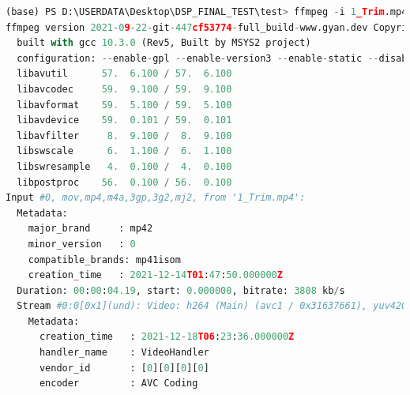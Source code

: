 \documentclass[10pt,UTF8]{ctexart}
\begin{document}
\begin{lstlisting}[language={python}]
(base) PS D:\USERDATA\Desktop\DSP_FINAL_TEST\test> ffmpeg -i 1_Trim.mp4 -s 320x240 -pix_fmt yuv420p -r 15 1_Trim.yuv
ffmpeg version 2021-09-22-git-447cf53774-full_build-www.gyan.dev Copyright (c) 2000-2021 the FFmpeg developers
  built with gcc 10.3.0 (Rev5, Built by MSYS2 project)
  configuration: --enable-gpl --enable-version3 --enable-static --disable-w32threads --disable-autodetect --enable-fontconfig --enable-iconv --enable-gnutls --enable-libxml2 --enable-gmp --enable-lzma --enable-libsnappy --enable-zlib --enable-librist --enable-libsrt --enable-libssh --enable-libzmq --enable-avisynth --enable-libbluray --enable-libcaca --enable-sdl2 --enable-libdav1d --enable-libzvbi --enable-librav1e --enable-libsvtav1 --enable-libwebp --enable-libx264 --enable-libx265 --enable-libxvid --enable-libaom --enable-libopenjpeg --enable-libvpx --enable-libass --enable-frei0r --enable-libfreetype --enable-libfribidi --enable-libvidstab --enable-libvmaf --enable-libzimg --enable-amf --enable-cuda-llvm --enable-cuvid --enable-ffnvcodec --enable-nvdec --enable-nvenc --enable-d3d11va --enable-dxva2 --enable-libmfx --enable-libglslang --enable-vulkan --enable-opencl --enable-libcdio --enable-libgme --enable-libmodplug --enable-libopenmpt --enable-libopencore-amrwb --enable-libmp3lame --enable-libshine --enable-libtheora --enable-libtwolame --enable-libvo-amrwbenc --enable-libilbc --enable-libgsm --enable-libopencore-amrnb --enable-libopus --enable-libspeex --enable-libvorbis --enable-ladspa --enable-libbs2b --enable-libflite --enable-libmysofa --enable-librubberband --enable-libsoxr --enable-chromaprint
  libavutil      57.  6.100 / 57.  6.100
  libavcodec     59.  9.100 / 59.  9.100
  libavformat    59.  5.100 / 59.  5.100
  libavdevice    59.  0.101 / 59.  0.101
  libavfilter     8.  9.100 /  8.  9.100
  libswscale      6.  1.100 /  6.  1.100
  libswresample   4.  0.100 /  4.  0.100
  libpostproc    56.  0.100 / 56.  0.100
Input #0, mov,mp4,m4a,3gp,3g2,mj2, from '1_Trim.mp4':
  Metadata:
    major_brand     : mp42
    minor_version   : 0
    compatible_brands: mp41isom
    creation_time   : 2021-12-14T01:47:50.000000Z
  Duration: 00:00:04.19, start: 0.000000, bitrate: 3808 kb/s
  Stream #0:0[0x1](und): Video: h264 (Main) (avc1 / 0x31637661), yuv420p, 544x960 [SAR 1:1 DAR 17:30], 3700 kb/s, 30 fps, 30 tbr, 30k tbn (default)
    Metadata:
      creation_time   : 2021-12-18T06:23:36.000000Z
      handler_name    : VideoHandler
      vendor_id       : [0][0][0][0]
      encoder         : AVC Coding

\end{lstlisting}
\end{document}
